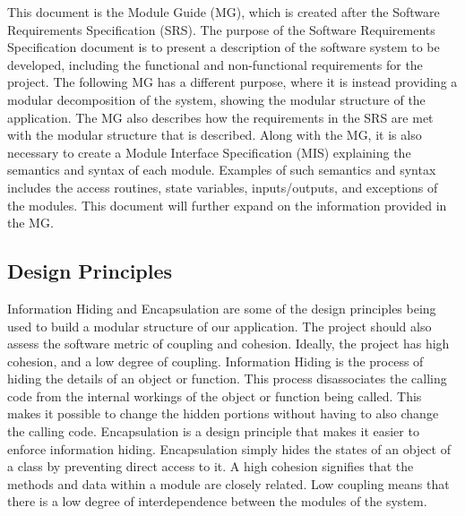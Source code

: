\documentclass[12pt, titlepage]{article}
\begin{document}
This document is the Module Guide (MG), which is created after the Software Requirements Specification (SRS). 
The purpose of the Software Requirements Specification document is to present a description of the software system to be developed, including the functional and non-functional requirements for the project. The following MG has a different purpose, where it is instead providing a modular decomposition of the system, showing the modular structure of the application. The MG also describes how the requirements in the SRS are met with the modular structure that is described.
Along with the MG, it is also necessary to create a Module Interface Specification (MIS) explaining the semantics and syntax of each module. Examples of such semantics and syntax includes the access routines, state variables, inputs/outputs, and exceptions of the modules. This document will further expand on the information provided in the MG.

\subsection{Design Principles}

Information Hiding and Encapsulation are some of the design principles being used to build a modular structure of our application. The project should also assess the software metric of coupling and cohesion. Ideally, the project has high cohesion, and a low degree of coupling.
Information Hiding is the process of hiding the details of an object or function. This process disassociates the calling code from the internal workings of the object or function being called. This makes it possible to change the hidden portions without having to also change the calling code. Encapsulation is a design principle that makes it easier to enforce information hiding. Encapsulation simply hides the states of an object of a class by preventing direct access to it. 
A high cohesion signifies that the methods and data within a module are closely related. Low coupling means that there is a low degree of interdependence between the modules of the system. 
\end{document}
